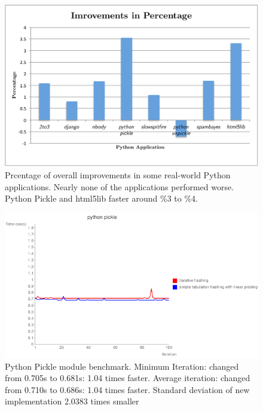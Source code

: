\documentclass[11pt]{article}
\begin{document}
\begin{figure}[H]
  \centering
  \includegraphics[width=12cm]{appsbench.pdf}
  \caption{Prcentage of overall improvements in some real-world Python applications. Nearly none of the applications performed worse. Python Pickle and html5lib faster around \%3 to \%4. }
\end{figure}

\begin{figure}[H]
  \centering
  \includegraphics[width=12cm]{slowpickle.png}
  \caption{Python Pickle module benchmark. Minimum Iteration: changed from 0.705s to 0.681s: 1.04 times faster. Average iteration: changed from 0.710s to 0.686s: 1.04 times faster. Standard deviation of new implementation 2.0383 times smaller}
\end{figure}


\end{document}
